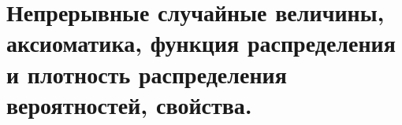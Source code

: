 \documentclass[polytech/stats/exam-2023/stats-exam-2023.tex]{subfiles}
\begin{document}
\section{Непрерывные случайные величины, аксиоматика, функция распределения и плотность распределения вероятностей, свойства.}
\end{document}
